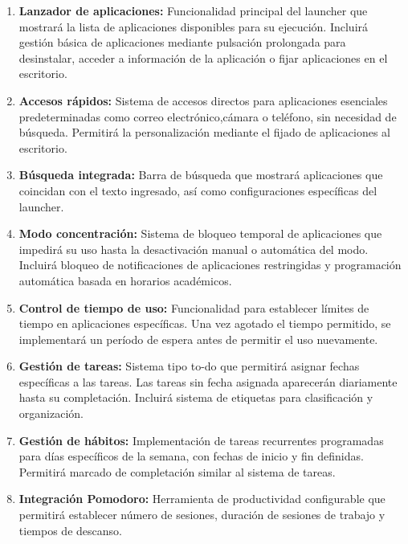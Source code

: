 \begin{enumerate}
    \item \textbf{Lanzador de aplicaciones:} Funcionalidad principal del launcher que mostrará la lista de aplicaciones disponibles para su ejecución. Incluirá gestión básica de aplicaciones mediante pulsación prolongada para desinstalar, acceder a información de la aplicación o fijar aplicaciones en el escritorio.
    
    \item \textbf{Accesos rápidos:} Sistema de accesos directos para aplicaciones esenciales predeterminadas como correo electrónico,cámara o teléfono, sin necesidad de búsqueda. Permitirá la personalización mediante el fijado de aplicaciones al escritorio.
    
    \item \textbf{Búsqueda integrada:} Barra de búsqueda que mostrará aplicaciones que coincidan con el texto ingresado, así como configuraciones específicas del launcher.
    
    \item \textbf{Modo concentración:} Sistema de bloqueo temporal de aplicaciones que impedirá su uso hasta la desactivación manual o automática del modo. Incluirá bloqueo de notificaciones de aplicaciones restringidas y programación automática basada en horarios académicos.
    
    \item \textbf{Control de tiempo de uso:} Funcionalidad para establecer límites de tiempo en aplicaciones específicas. Una vez agotado el tiempo permitido, se implementará un período de espera antes de permitir el uso nuevamente.
    
    \item \textbf{Gestión de tareas:} Sistema tipo to-do que permitirá asignar fechas específicas a las tareas. Las tareas sin fecha asignada aparecerán diariamente hasta su completación. Incluirá sistema de etiquetas para clasificación y organización.
    
    \item \textbf{Gestión de hábitos:} Implementación de tareas recurrentes programadas para días específicos de la semana, con fechas de inicio y fin definidas. Permitirá marcado de completación similar al sistema de tareas.
    
    \item \textbf{Integración Pomodoro:} Herramienta de productividad configurable que permitirá establecer número de sesiones, duración de sesiones de trabajo y tiempos de descanso.
\end{enumerate}


